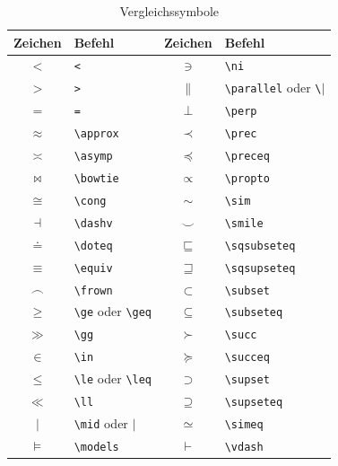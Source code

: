 \documentclass[a4paper,10pt,twoside]{scrbook}
\begin{document}
\begin{table}[h!tb]
\centering
\caption{Vergleichssymbole}
\label{Tabelle_Vergleichssymbole}       %
\begin{tabular}{clcl}
\hline
Zeichen & Befehl & Zeichen & Befehl  \\
\hline
$<$ & \texttt{<} &
$\ni$ & \texttt{\textbackslash ni} \\
$>$ & \texttt{>} &
$\parallel$ & \texttt{\textbackslash parallel} oder \texttt{\textbackslash$|$} \\
$=$ & \texttt{=} &
$\perp$ & \texttt{\textbackslash perp} \\
$\approx$ & \texttt{\textbackslash approx} & 
$\prec$ & \texttt{\textbackslash prec} \\
$\asymp$ & \texttt{\textbackslash asymp} & 
$\preceq$ & \texttt{\textbackslash preceq} \\
$\bowtie$ & \texttt{\textbackslash bowtie} & 
$\propto$ & \texttt{\textbackslash propto} \\ 
$\cong$ & \texttt{\textbackslash cong} &
$\sim$ & \texttt{\textbackslash sim} \\
$\dashv$ & \texttt{\textbackslash dashv} & 
$\smile$ & \texttt{\textbackslash smile} \\
$\doteq$ & \texttt{\textbackslash doteq} & 
$\sqsubseteq$ & \texttt{\textbackslash sqsubseteq} \\
$\equiv$ & \texttt{\textbackslash equiv} & 
$\sqsupseteq$ & \texttt{\textbackslash sqsupseteq} \\
$\frown$ & \texttt{\textbackslash frown} & 
$\subset$ & \texttt{\textbackslash subset} \\  
$\geq$ & \texttt{\textbackslash ge} oder \texttt{\textbackslash geq} &
$\subseteq$ & \texttt{\textbackslash subseteq} \\
$\gg$ & \texttt{\textbackslash gg} & 
$\succ$ & \texttt{\textbackslash succ} \\
$\in$ & \texttt{\textbackslash in} & 
$\succeq$ & \texttt{\textbackslash succeq} \\
$\le$ & \texttt{\textbackslash le} oder \texttt{\textbackslash leq} & 
$\supset$ & \texttt{\textbackslash supset} \\
$\ll$ & \texttt{\textbackslash ll} & 
$\supseteq$ & \texttt{\textbackslash supseteq} \\
$\mid$ & \texttt{\textbackslash mid} oder \texttt{$|$} &
$\simeq$ & \texttt{\textbackslash simeq} \\
$\models$ & \texttt{\textbackslash models} & 
$\vdash$ & \texttt{\textbackslash vdash} \\
\hline
\end{tabular}
\end{table}
\end{document}
